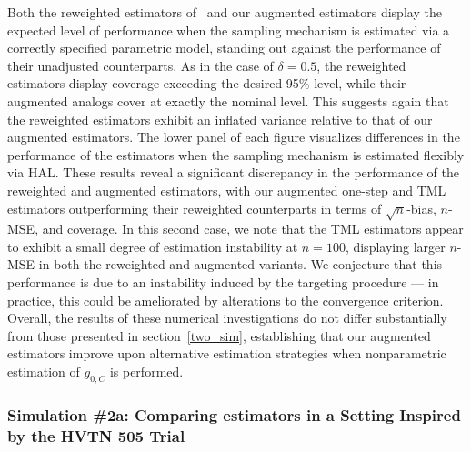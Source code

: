 Both the reweighted estimators of~\citet{rose2011targeted2sd} and our augmented
estimators display the expected level of performance when the sampling mechanism
is estimated via a correctly specified parametric model, standing out against
the performance of their unadjusted counterparts. As in the case of $\delta
= 0.5$, the reweighted estimators display coverage exceeding the desired 95\%
level, while their augmented analogs cover at exactly the nominal level. This
suggests again that the reweighted estimators exhibit an inflated variance
relative to that of our augmented estimators. The lower panel of each figure
visualizes differences in the performance of the estimators when the sampling
mechanism is estimated flexibly via HAL. These results reveal a significant
discrepancy in the performance of the reweighted and augmented estimators, with
our augmented one-step and TML estimators outperforming their reweighted
counterparts in terms of $\sqrt{n}$-bias, $n$-MSE, and coverage. In this second
case, we note that the TML estimators appear to exhibit a small degree of
estimation instability at $n = 100$, displaying larger $n$-MSE in both the
reweighted and augmented variants. We conjecture that this performance is due to
an instability induced by the targeting procedure --- in practice, this could be
ameliorated by alterations to the convergence criterion. Overall, the results of
these numerical investigations do not differ substantially from those presented
in section~\ref{two_sim}, establishing that our augmented estimators improve
upon alternative estimation strategies when nonparametric estimation of
$g_{0,C}$ is performed.

\subsubsection{Simulation \#2a: Comparing estimators in a Setting Inspired by
  the HVTN 505 Trial}\label{hvtn_sim}

